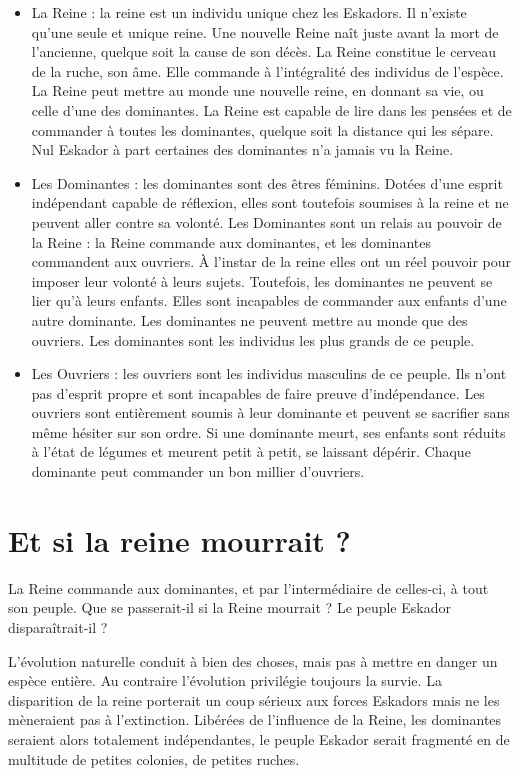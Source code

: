 \begin{multicols}{2}
\begin{itemize}
\item La Reine : la reine est un individu unique chez les Eskadors. Il n'existe qu'une seule et unique reine. Une nouvelle Reine naît juste avant la mort de l'ancienne, quelque soit la cause de son décès. La Reine constitue le cerveau de la ruche, son âme. Elle commande à l'intégralité des individus de l'espèce. La Reine peut mettre au monde une nouvelle reine, en donnant sa vie, ou celle d'une des dominantes. La Reine est capable de lire dans les pensées et de commander à toutes les dominantes, quelque soit la distance qui les sépare. Nul Eskador à part certaines des dominantes n'a jamais vu la Reine.

\item Les Dominantes : les dominantes sont des êtres féminins. Dotées d'une esprit indépendant capable de réflexion, elles sont toutefois soumises à la reine et ne peuvent aller contre sa volonté. Les Dominantes sont un relais au pouvoir de la Reine : la Reine commande aux dominantes, et les dominantes commandent aux ouvriers. À l'instar de la reine elles ont un réel pouvoir pour imposer leur volonté à leurs sujets. Toutefois, les dominantes ne peuvent se lier qu'à leurs enfants. Elles sont incapables de commander aux enfants d'une autre dominante. Les dominantes ne peuvent mettre au monde que des ouvriers. Les dominantes sont les individus les plus grands de ce peuple.

\item Les Ouvriers : les ouvriers sont les individus masculins de ce peuple. Ils n'ont pas d'esprit propre et sont incapables de faire preuve d'indépendance. Les ouvriers sont entièrement soumis à leur dominante et peuvent se sacrifier sans même hésiter sur son ordre. Si une dominante meurt, ses enfants sont réduits à l'état de légumes et meurent petit à petit, se laissant dépérir. Chaque dominante peut commander un bon millier d'ouvriers.

\end{itemize} 

\section{Et si la reine mourrait ?}

La Reine commande aux dominantes, et par l'intermédiaire de celles-ci, à tout son peuple. Que se passerait-il si la Reine mourrait ? Le peuple Eskador disparaîtrait-il ? 

L'évolution naturelle conduit à bien des choses, mais pas à mettre en danger un espèce entière. Au contraire l'évolution privilégie toujours la survie. La disparition de la reine porterait un coup sérieux aux forces Eskadors mais ne les mèneraient pas à l'extinction. Libérées de l'influence de la Reine, les dominantes seraient alors totalement indépendantes, le peuple Eskador serait fragmenté en de multitude de petites colonies, de petites ruches. 


\end{multicols}
